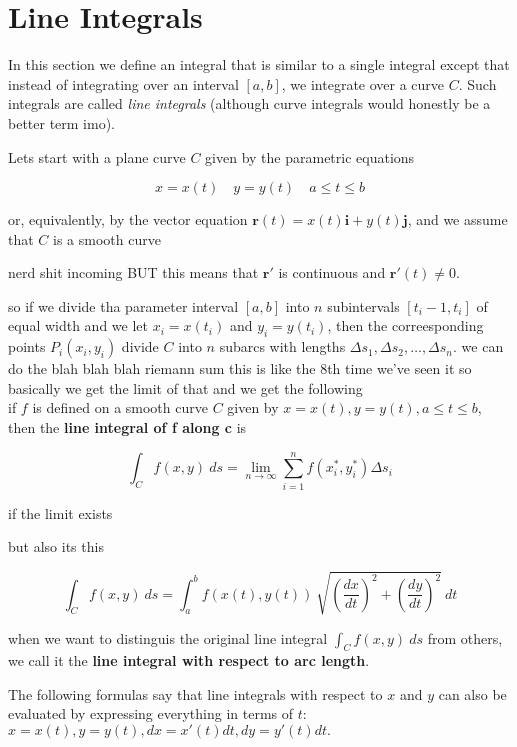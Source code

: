 \documentclass{article}
\begin{document}
\newpage
\section{Line Integrals}

In this section we define an integral that is similar to a single integral except that instead of integrating over an interval $[a,b]$, we integrate over a curve $C$. Such integrals are called \textit{line integrals} (although curve integrals would honestly be a better term imo).

Lets start with a plane curve $C$ given by the parametric equations

$$x = x(t) \quad y = y(t) \quad a \leq t \leq b$$

or, equivalently, by the vector equation $\mathbf{r}(t) = x(t)\mathbf{i} + y(t)\mathbf{j}$, and we assume that $C$ is a smooth curve

nerd shit incoming BUT this means that $\mathbf{r'}$ is continuous and $\mathbf{r}'(t) \neq 0$.

so if we divide tha parameter interval $[a,b]$ into $n$ subintervals $[t_i-1, t_i]$ of equal width and we let $x_i = x(t_i)$ and $y_i = y(t_i)$, then the correesponding points $P_i(x_i,y_i)$ divide $C$ into $n$ subarcs with lengths $\Delta s_1, \Delta s_2, \dots, \Delta s_n$. we can do the blah blah blah riemann sum this is like the 8th time we've seen it so basically we get the limit of that and we get the following \\ 

if $f$ is defined on a smooth curve $C$ given by $x = x(t), y = y(t), a \leq t \leq b$, then the \textbf{line integral of f along c} is 

\begin{equation*}
    \int_C f(x,y) \ ds = \lim_{n \rightarrow \infty} \sum_{i=1}^{n} f(x_i^*, y_i^*) \Delta s_i
\end{equation*}

if the limit exists


but also its this

\begin{equation*}
    \int_C f(x,y) \ ds = \int^b_a f(x(t), y(t)) \ \sqrt{(\frac{dx}{dt})^2 + (\frac{dy}{dt})^2} \  dt
\end{equation*}

when we want to distinguis the original line integral $\int_C f(x,y) \ ds $ from others, we call it the \textbf{line integral with respect to arc length}.

The following formulas say that line integrals with respect to $x$ and $y$ can also be evaluated by expressing everything in terms of $t$: $x = x(t), y = y(t), dx = x'(t)dt, dy = y'(t)dt.$
\end{document}
